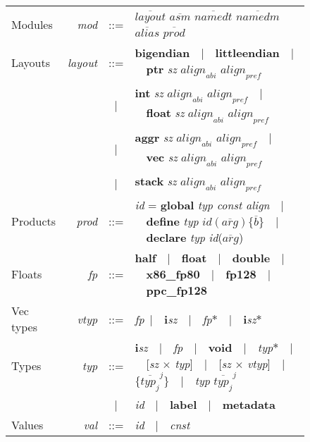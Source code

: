 \documentclass[a4paper]{book}
\begin{document}
\begin{figure}[hb]
\begin{tabular}{ l r c l }
Modules & \textit{mod} & ::= & $\overline{\textit{layout}}$ $\overline{\textit{asm}}$ $\overline{\textit{namedt}}$ $\overline{\textit{namedm}}$ $\overline{\textit{alias}}$ $\overline{\textit{prod}}$ \\

Layouts & \textit{layout} & ::= & \textbf{bigendian}~~|~~\textbf{littleendian}~~|~~\textbf{ptr} \textit{sz} $\textit{align}_{\textit{abi}}$ $\textit{align}_{\textit{pref}}$ \\
 & & | & \textbf{int} \textit{sz} $\textit{align}_{\textit{abi}}$ $\textit{align}_{\textit{pref}}$~~|~~\textbf{float} \textit{sz} $\textit{align}_{\textit{abi}}$ $\textit{align}_{\textit{pref}}$ \\
& & | & \textbf{aggr} \textit{sz} $\textit{align}_{\textit{abi}}$ $\textit{align}_{\textit{pref}}$~~|~~\textbf{vec} \textit{sz} $\textit{align}_{\textit{abi}}$ $\textit{align}_{\textit{pref}}$ \\
& & | & \textbf{stack} \textit{sz} $\textit{align}_{\textit{abi}}$ $\textit{align}_{\textit{pref}}$ \\

Products & \textit{prod} & ::= & \textit{id} = \textbf{global} \textit{typ const align}~~|~~\textbf{define} \textit{typ} $\textit{id}(\overline{\textit{arg}})\{\overline{\textit{b}}\}$~~|~~\textbf{declare} \textit{typ} \textit{id}($\overline{\textit{arg}}$) \\

Floats & \textit{fp} & ::= & \textbf{half}~~|~~\textbf{float}~~|~~\textbf{double}~~|~~\textbf{x86\_fp80}~~|~~\textbf{fp128}~~|~~\textbf{ppc\_fp128} \\

Vec types & \textit{vtyp} & ::= & \textit{fp}~|~~\textbf{i}\textit{sz}~~|~~\textit{fp}$*$~~|~~\textbf{i}\textit{sz}$*$ \\

Types & \textit{typ} & ::= & \textbf{i}\textit{sz}~~|~~\textit{fp}~~|~~\textbf{void}~~|~~\textit{typ}$*$~~|~~[\textit{sz} $\times$ \textit{typ}]~~|~~[\textit{sz} $\times$ \textit{vtyp}]~~|~~$\big\{\overline{\textit{typ}_j}^j\big\}$~~|~~\textit{typ} $\overline{\textit{typ}_j}^j$ \\
& & | & \textit{id}~~|~~\textbf{label}~~|~~\textbf{metadata} \\

Values & \textit{val} & ::= & \textit{id}~~|~~\textit{cnst} \\


\end{tabular}
\end{figure}
\end{document}
